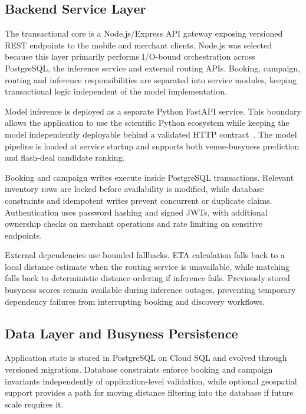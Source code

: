 \documentclass[conference]{IEEEtran}
\begin{document}
\subsection{Backend Service Layer}
\label{sec:backend}

The transactional core is a Node.js/Express API gateway exposing versioned
REST endpoints to the mobile and merchant clients. Node.js was selected
because this layer primarily performs I/O-bound orchestration across
PostgreSQL, the inference service and external routing APIs. Booking,
campaign, routing and inference responsibilities are separated into service
modules, keeping transactional logic independent of the model implementation.

Model inference is deployed as a separate Python FastAPI service. This
boundary allows the application to use the scientific Python ecosystem while
keeping the model independently deployable behind a validated HTTP
contract~\cite{dragoni2017microservices}. The model pipeline is loaded at
service startup and supports both venue-busyness prediction and flash-deal
candidate ranking.

Booking and campaign writes execute inside PostgreSQL transactions. Relevant
inventory rows are locked before availability is modified, while database
constraints and idempotent writes prevent concurrent or duplicate claims.
Authentication uses password hashing and signed JWTs, with additional
ownership checks on merchant operations and rate limiting on sensitive
endpoints.

External dependencies use bounded fallbacks. ETA calculation falls back to a
local distance estimate when the routing service is unavailable, while
matching falls back to deterministic distance ordering if inference fails.
Previously stored busyness scores remain available during inference outages,
preventing temporary dependency failures from interrupting booking and
discovery workflows.

\subsection{Data Layer and Busyness Persistence}
\label{sec:busyness-persistence}

Application state is stored in PostgreSQL on Cloud SQL and evolved through
versioned migrations. Database constraints enforce booking and campaign
invariants independently of application-level validation, while optional
geospatial support provides a path for moving distance filtering into the
database if future scale requires it.
\end{document}
